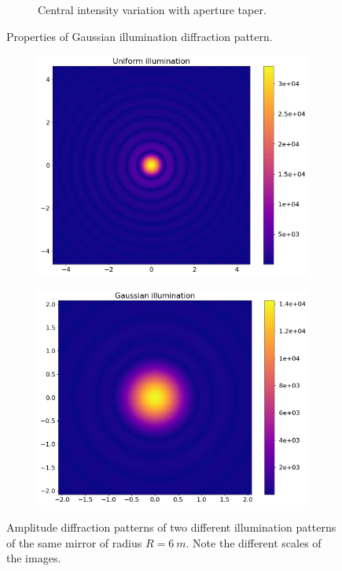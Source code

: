 \documentclass[11pt]{article}
\begin{document}
\begin{figure}
\begin{subfigure}{0.5\textwidth}
        \caption{Central intensity variation with aperture taper.}\label{fig:gauss:int}
    \end{subfigure}
    \caption{Properties of Gaussian illumination diffraction pattern.}\label{fig:gauss}
\end{figure}

\begin{figure}
    \centering
    \begin{subfigure}{0.5\textwidth}
        \centering
        \includegraphics[width=\textwidth]{pictures/gauss/uniform.png}
        \caption{}\label{fig:gpic:uniform}
    \end{subfigure}%
    \begin{subfigure}{0.5\textwidth}
        \centering
        \includegraphics[width=\textwidth]{pictures/gauss/gaussian.png}
        \caption{}\label{fig:gpic:gauss}
    \end{subfigure}
    \caption{Amplitude diffraction patterns of two different illumination patterns of the same mirror of radius $R=\SI{6}{m}$. Note the different scales of the images.}\label{fig:gpic}
\end{figure}
\end{document}
